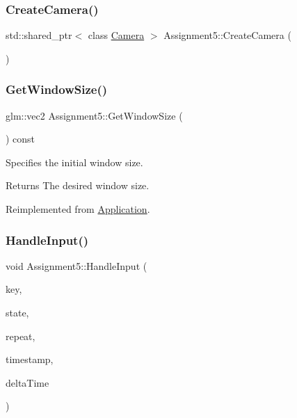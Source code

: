 \hypertarget{class_assignment5_af80167ddbf48815460a463fc704eb2ce}{}\label{class_assignment5_af80167ddbf48815460a463fc704eb2ce}
\subsubsection{\texorpdfstring{Create\+Camera()}{CreateCamera()}}
{\footnotesize\ttfamily std\+::shared\+\_\+ptr$<$ class \hyperlink{class_camera}{Camera} $>$ Assignment5\+::\+Create\+Camera (\begin{DoxyParamCaption}{ }\end{DoxyParamCaption})\hspace{0.3cm}{\ttfamily [static]}}

\hypertarget{class_assignment5_ac199b6149ffa3dbedc7e0d49bb24c628}{}\label{class_assignment5_ac199b6149ffa3dbedc7e0d49bb24c628}
\subsubsection{\texorpdfstring{Get\+Window\+Size()}{GetWindowSize()}}
{\footnotesize\ttfamily glm\+::vec2 Assignment5\+::\+Get\+Window\+Size (\begin{DoxyParamCaption}{ }\end{DoxyParamCaption}) const\hspace{0.3cm}{\ttfamily [virtual]}}



Specifies the initial window size.

\begin{DoxyReturn}{Returns}
The desired window size.
\end{DoxyReturn}


Reimplemented from \hyperlink{class_application_ab190ae0e987fe95682714dd4b2495e82}{Application}.

\hypertarget{class_assignment5_aab8f8440144665db9aafd7ca1cf55cff}{}\label{class_assignment5_aab8f8440144665db9aafd7ca1cf55cff}
\subsubsection{\texorpdfstring{Handle\+Input()}{HandleInput()}}
{\footnotesize\ttfamily void Assignment5\+::\+Handle\+Input (\begin{DoxyParamCaption}\item[{S\+D\+L\+\_\+\+Keysym}]{key,  }\item[{Uint32}]{state,  }\item[{Uint8}]{repeat,  }\item[{double}]{timestamp,  }\item[{double}]{delta\+Time }\end{DoxyParamCaption})\hspace{0.3cm}{\ttfamily [virtual]}}



